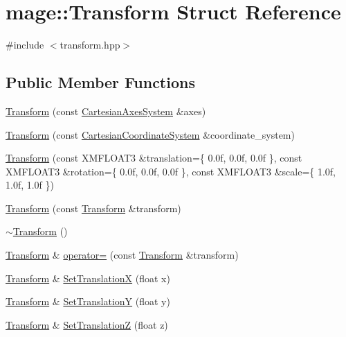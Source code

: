 \hypertarget{structmage_1_1_transform}{}\section{mage\+:\+:Transform Struct Reference}
\label{structmage_1_1_transform}


{\ttfamily \#include $<$transform.\+hpp$>$}

\subsection*{Public Member Functions}
\begin{DoxyCompactItemize}
\item 
\hyperlink{structmage_1_1_transform_a1a4624639a7da3608738f52b8cfc6bf3}{Transform} (const \hyperlink{structmage_1_1_cartesian_axes_system}{Cartesian\+Axes\+System} \&axes)
\item 
\hyperlink{structmage_1_1_transform_a15966913f9d2f02f29da116637fc3bff}{Transform} (const \hyperlink{structmage_1_1_cartesian_coordinate_system}{Cartesian\+Coordinate\+System} \&coordinate\+\_\+system)
\item 
\hyperlink{structmage_1_1_transform_a3d324dc935e11ee5e82957d58553fd7d}{Transform} (const X\+M\+F\+L\+O\+A\+T3 \&translation=\{ 0.\+0f, 0.\+0f, 0.\+0f \}, const X\+M\+F\+L\+O\+A\+T3 \&rotation=\{ 0.\+0f, 0.\+0f, 0.\+0f \}, const X\+M\+F\+L\+O\+A\+T3 \&scale=\{ 1.\+0f, 1.\+0f, 1.\+0f \})
\item 
\hyperlink{structmage_1_1_transform_a6cf7a754eff6ffe6f99f8942468d49bc}{Transform} (const \hyperlink{structmage_1_1_transform}{Transform} \&transform)
\item 
\hyperlink{structmage_1_1_transform_a3380713ee853d112c140e8688c0f73b5}{$\sim$\+Transform} ()
\item 
\hyperlink{structmage_1_1_transform}{Transform} \& \hyperlink{structmage_1_1_transform_a40bc8c32b09dc419d0573fffcd938644}{operator=} (const \hyperlink{structmage_1_1_transform}{Transform} \&transform)
\item 
\hyperlink{structmage_1_1_transform}{Transform} \& \hyperlink{structmage_1_1_transform_ab358f92a88e8e7bca86bf77e4ba09e6f}{Set\+TranslationX} (float x)
\item 
\hyperlink{structmage_1_1_transform}{Transform} \& \hyperlink{structmage_1_1_transform_ad3b4b96c316321f19d71dcde8dd82220}{Set\+TranslationY} (float y)
\item 
\hyperlink{structmage_1_1_transform}{Transform} \& \hyperlink{structmage_1_1_transform_a4fa664d666f3b907d4dfbc0d9cd3a13a}{Set\+TranslationZ} (float z)

\end{DoxyCompactItemize}

